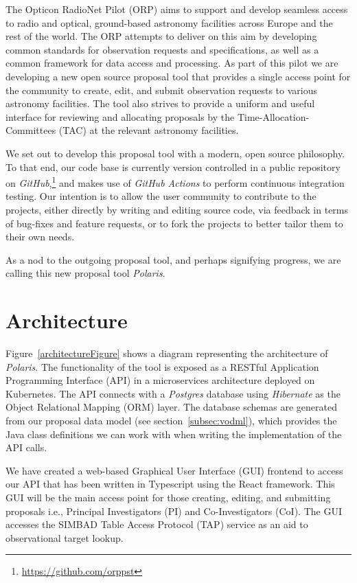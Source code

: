 \documentclass[11pt,twoside]{article}
\begin{document}
The Opticon RadioNet Pilot (ORP) aims to support and develop seamless access to radio and optical,
ground-based astronomy facilities across Europe and the rest of the world.
The ORP attempts to deliver on this aim by developing common standards for observation requests and
specifications, as well as a common framework for data access and processing.
As part of this pilot we are developing a new open source proposal tool that provides
a single access point for the community to create, edit, and submit observation requests to various astronomy
facilities.
The tool also strives to provide a uniform and useful interface for reviewing and allocating proposals by the
Time-Allocation-Committees (TAC) at the relevant astronomy facilities.

We set out to develop this proposal tool with a modern, open source philosophy.
To that end, our code base is currently version controlled in a public repository on
\emph{GitHub},\footnote{\url{https://github.com/orppst}} and makes use of \emph{GitHub Actions} to perform continuous
integration testing.
Our intention is to allow the user community to contribute to the projects, either directly by writing and
editing source code, via feedback in terms of bug-fixes and feature requests, or to fork the projects to
better tailor them to their own needs.

As a nod to the outgoing proposal tool, and perhaps signifying progress, we are calling this new proposal tool
\emph{Polaris}.

\section{Architecture}\label{sec:architecture}

Figure~\ref{architectureFigure} shows a diagram representing the architecture of \emph{Polaris}.
The functionality of the tool is exposed as a RESTful Application Programming Interface (API) in a
microservices architecture deployed on Kubernetes.
The API connects with a \emph{Postgres} database using \emph{Hibernate} as the Object Relational Mapping (ORM) layer.
The database schemas are generated from our proposal data model (see section~\ref{subsec:vodml}), which provides
the Java class definitions we can work with when writing the implementation of the API calls.


We have created a web-based Graphical User Interface (GUI) frontend to access our API that has been
written in Typescript using the React framework.
This GUI will be the main access point for those creating, editing, and submitting proposals i.e.,
Principal Investigators (PI) and Co-Investigators (CoI).
The GUI accesses the SIMBAD Table Access Protocol (TAP) service as an aid to observational target lookup.
\end{document}

